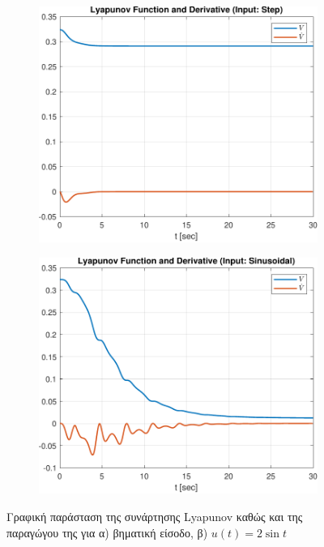 \documentclass[a4paper,12pt]{article}
\begin{document}
\begin{figure}[htbp]
  \centering
  \begin{subfigure}[b]{0.45\textwidth}
    \centering
    \includegraphics[width=\textwidth]{plot/task1_lyapunov_step.pdf}
    \caption{}
    \label{fig:task1_lyapunov_step}
  \end{subfigure}
  \hfill
  \begin{subfigure}[b]{0.45\textwidth}
    \centering
    \includegraphics[width=\textwidth]{plot/task1_lyapunov_sinusoidal.pdf}
    \caption{}
    \label{fig:task1_lyapunov_sinusoidal}
  \end{subfigure}
  \caption{Γραφική παράσταση της συνάρτησης Lyapunov καθώς και
  της παραγώγου της για α) βηματική είσοδο, β) $u(t) = 2 \sin t$}
  \label{fig:task1_lyapunov}
\end{figure}
\end{document}
